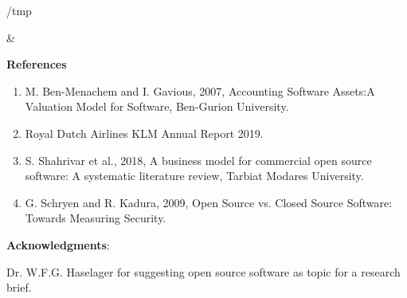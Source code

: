 \documentclass[portrait,a0paper]{rudi-poster}  %
\def\overleafhome{/tmp}%
\newcommand{\References}{
    \textbf{References}%
    \begin{enumerate}
    \itemsep-1em 
\item  M. Ben-Menachem and I. Gavious, 2007, Accounting Software Assets:A Valuation Model for Software,  Ben-Gurion University.\\ %
\item Royal Dutch Airlines KLM Annual Report 2019.\\ %
\item S. Shahrivar et al., 2018, A business model for commercial open source software: A systematic literature review, Tarbiat Modares University.\\ %
\item G. Schryen and R. Kadura, 2009, Open Source vs. Closed Source Software: Towards Measuring Security. %
\end{enumerate}}
\newcommand{\Acknowledgments}{
	\textbf{Acknowledgments}:
    \begin{itemize*}[label=]
    	\item Dr. W.F.G. Haselager for suggesting open source software as topic for a research brief.
    \end{itemize*}}
\begin{document}

\begin{paralleltwoblocks}{0.67}
    \begin{rudiblockipolicyrecommendations}
        \begin{multicols}{2}
            \ifx\homepath\overleafhome
            
        \else
            
        \fi
        \end{multicols}
    \end{rudiblockipolicyrecommendations}
    &
    {
    \begin{rudiblockaddendum}
    	\small
    	\References\par
        \Acknowledgments\par
        
    \end{rudiblockaddendum}
    }
\end{paralleltwoblocks}

\clearpage
\end{document}
